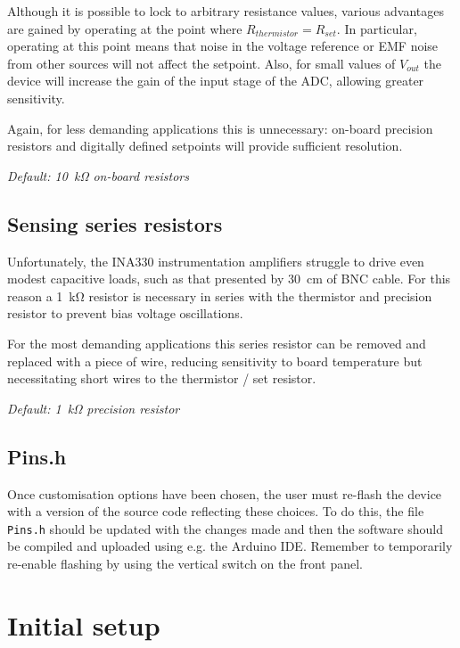 \documentclass[11pt]{report}
\newcommand{\RSeries}{\SI{1}{\kilo\ohm}}
\newcommand{\RSet}{\SI{10}{\kilo\ohm}}
\begin{document}
Although it is possible to lock to arbitrary resistance values, various advantages are gained by operating at the point where $R_{thermistor} = R_{set}$. In particular, operating at this point means that noise in the voltage reference or EMF noise from other sources will not affect the setpoint. Also, for small values of $V_{out}$ the device will increase the gain of the input stage of the ADC, allowing greater sensitivity. 

Again, for less demanding applications this is unnecessary: on-board precision resistors and digitally defined setpoints will provide sufficient resolution.


\textit{Default: \RSet{} on-board resistors}

\section{Sensing series resistors}

Unfortunately, the INA330 instrumentation amplifiers struggle to drive even modest capacitive loads, such as that presented by \SI{30}{\cm} of BNC cable. For this reason a \SI{1}{\kilo\ohm} resistor is necessary in series with the thermistor and precision resistor to prevent bias voltage oscillations.

For the most demanding applications this series resistor can be removed and replaced with a piece of wire, reducing sensitivity to board temperature but necessitating short wires to the thermistor / set resistor. 

\textit{Default: \RSeries{} precision resistor}

\section{Pins.h}
\label{ssec:Pins}

Once customisation options have been chosen, the user must re-flash the device with a version of the source code reflecting these choices. To do this, the file \texttt{Pins.h} should be updated with the changes made and then the software should be compiled and uploaded using e.g. the Arduino IDE. Remember to temporarily re-enable flashing by using the vertical switch on the front panel. 


\chapter{Initial setup} %
\label{sec:initial_setup}
\end{document}
